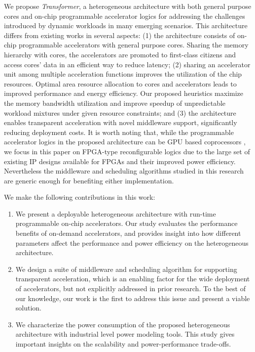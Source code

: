 We propose {\em Transformer}, a heterogeneous architecture with both
general purpose cores and on-chip programmable accelerator logics for
addressing the challenges introduced by dynamic workloads in many
emerging scenarios. This architecture differs from existing works in
several aspects: (1) the architecture consists of on-chip programmable
accelerators with general purpose cores.  Sharing the memory hierarchy
with cores, the accelerators are promoted to first-class citizens and
access cores' data in an efficient way to reduce latency;  
(2) sharing an accelerator unit among multiple acceleration functions
improves the utilization of the chip resources. Optimal area resource
allocation to cores and accelerators leads to improved performance and
energy efficiency. Our proposed heuristics maximize the memory
bandwidth utilization and improve speedup of unpredictable workload
mixtures under given resource constraints; and (3) the architecture
enables transparent acceleration with novel middleware support,
significantly reducing deployment costs.  It is worth noting that,
while the programmable accelerator logics in the proposed architecture
can be GPU based coprocessors \cite{intel-gpu}, we focus in this paper
on FPGA-type reconfigurable logics due to the large set of existing IP
designs available for FPGAs and their improved power
efficiency. Nevertheless the middleware and scheduling algorithms
studied in this research are generic enough for benefiting either
implementation.

We make the following contributions in this work:
\begin{enumerate}

\item We present a deployable heterogeneous architecture with run-time
  programmable on-chip accelerators. Our study evaluates the
  performance benefits of on-demand accelerators, and provides insight into how different parameters affect the performance and power efficiency on the heterogeneous architecture.

\item We design a suite of middleware and scheduling algorithm for
  supporting transparent acceleration, which is an enabling factor for
  the wide deployment of accelerators, but not explicitly addressed in
  prior research. To the best of our knowledge, our work is the first
  to address this issue and present a viable solution.

\item We characterize the power consumption of the proposed
  heterogeneous architecture with industrial level power modeling
  tools. This study gives important insights on the scalability and
  power-performance trade-offs.

\end{enumerate}

